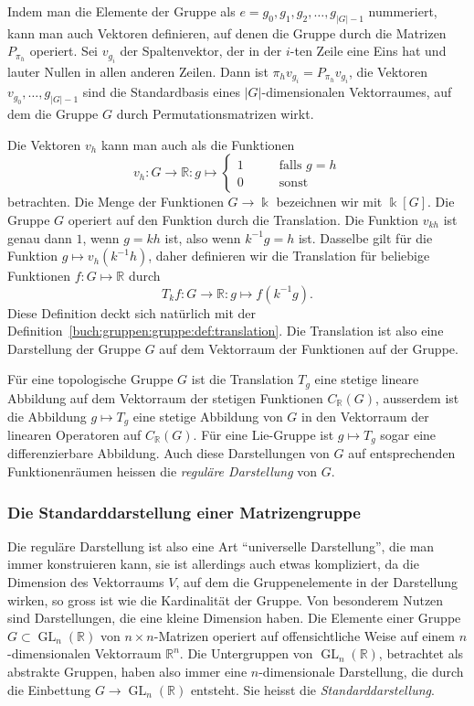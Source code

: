 Indem man die Elemente der Gruppe als $e=g_0,g_1,g_2,\dots,g_{|G|-1}$
nummeriert, kann man auch Vektoren definieren, auf denen die
Gruppe durch die Matrizen $P_{\pi_h}$ operiert.
Sei $v_{g_i}$ der Spaltenvektor, der in der $i$-ten Zeile eine Eins
hat und lauter Nullen in allen anderen Zeilen.
Dann ist $\pi_{h}v_{g_i}=P_{\pi_h}v_{g_i}$, die Vektoren
$v_{g_0},\dots,g_{|G|-1}$ sind die Standardbasis eines $|G|$-dimensionalen
Vektorraumes, auf dem die Gruppe $G$ durch Permutationsmatrizen wirkt.

Die Vektoren $v_h$ kann man auch als die Funktionen
\[
v_h
\colon
G\to\mathbb{R}
:
g\mapsto
\begin{cases}
1&\qquad\text{falls $g=h$}\\
0&\qquad\text{sonst}
\end{cases}
\]
betrachten.
Die Menge der Funktionen $G\to\Bbbk$ bezeichnen wir mit $\Bbbk[G]$.
Die Gruppe $G$ operiert auf den Funktion durch die Translation.
Die Funktion $v_{kh}$ ist genau dann $1$, wenn $g=kh$ ist, also wenn $k^{-1}g=h$
ist.
Dasselbe gilt für die Funktion $g\mapsto v_h(k^{-1}h)$, daher definieren wir
die Translation für beliebige Funktionen $f\colon G\mapsto \mathbb{R}$
durch
\[
T_kf\colon G\to\mathbb{R}:g\mapsto f(k^{-1}g).
\]
Diese Definition deckt sich natürlich mit der
Definition~\ref{buch:gruppen:gruppe:def:translation}.
Die Translation ist also eine Darstellung der Gruppe $G$ auf dem
Vektorraum der Funktionen auf der Gruppe.

Für eine topologische Gruppe $G$ ist die Translation $T_g$ eine 
stetige lineare Abbildung auf dem Vektorraum der stetigen Funktionen
$C_{\mathbb{R}}(G)$, ausserdem ist die Abbildung $g\mapsto T_g$ eine
stetige Abbildung von $G$ in den Vektorraum der linearen Operatoren
auf $C_{\mathbb{R}}(G)$.
Für eine Lie-Gruppe ist $g\mapsto T_g$ sogar eine differenzierbare
Abbildung.
Auch diese Darstellungen von $G$ auf entsprechenden Funktionenräumen
heissen die {\em reguläre Darstellung} von $G$.

%
%
\subsubsection{Die Standarddarstellung einer Matrizengruppe}
Die reguläre Darstellung ist also eine Art ``universelle Darstellung'',
die man immer konstruieren kann, sie ist allerdings auch etwas kompliziert,
da die Dimension des Vektorraums $V$, auf dem die Gruppenelemente in der
Darstellung wirken, so gross ist wie die Kardinalität der Gruppe.
Von besonderem Nutzen sind Darstellungen, die eine kleine Dimension haben.
Die Elemente einer Gruppe $G\subset\operatorname{GL}_n(\mathbb{R})$
von $n\times n$-Matrizen operiert auf offensichtliche Weise auf einem
$n$-dimensionalen Vektorraum $\mathbb{R}^n$.
Die Untergruppen von $\operatorname{GL}_n(\mathbb{R})$, betrachtet
als abstrakte Gruppen, haben also immer eine $n$-dimensionale Darstellung,
die durch die Einbettung $G\to \operatorname{GL}_n(\mathbb{R})$ entsteht.
Sie heisst die {\em Standarddarstellung}.

